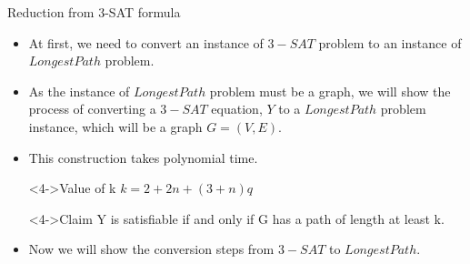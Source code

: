 \begin{frame}{Reduction from 3-SAT formula}

   

  \begin{itemize}
        \item<1-> At first, we need to convert an instance of \textbf{$3-SAT$} problem to an instance of \textbf{$Longest Path$} problem.
        \item<2-> As the instance of $Longest Path$ problem must be a graph, we will show the process of converting a $3-SAT$ equation, $Y$ to a $Longest Path$ problem instance, which will be a graph $G =(V,E)$.
        \item<3-> This construction takes polynomial time.
        
     \begin{block}<4->{Value of k}
        $k=2+2n+(3+n)q$
     \end{block}      
     \begin{block}<4->{Claim}
        Y is satisfiable if and only if G has a path of length at least k.
     \end{block}
        \item<5-> Now we will show the conversion steps from $3-SAT$ to $Longest Path$.
    
\end{itemize} 


\end{frame}